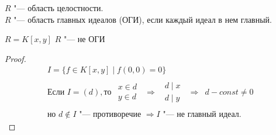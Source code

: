 \begin{Def}
	$R$ "--- область целостности.\\
	$R$ "--- область главных идеалов (ОГИ), если каждый идеал в нем главный.
\end{Def}

\begin{exmp}
	$R = K\left[x, y\right]$ $R$ "--- не ОГИ
	\begin{proof}
		\begin{gather*}
			I = \{f \in K\left[x,y\right] \mid f\left(0,0\right) = 0\} \\
			\text{Если } I = \left(d\right), \text{то}
			\begin{array}{rcccl}
				\begin{array}{c} x \in d \\ y \in d \end{array}
				& \Rightarrow & 
				\begin{array}{c} d \mid x \\ d \mid y \end{array}
				& \Rightarrow & 
				d - const \neq 0
			\end{array} \\
			\text{но } d \notin I  \text{ "--- противоречие } \Rightarrow I \text{ "--- не главный идеал.}
		\end{gather*}
	\end{proof}
\end{exmp}


